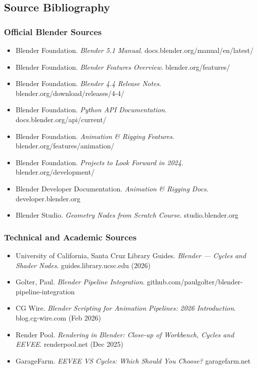 \documentclass[11pt,letterpaper]{article}
\begin{document}
\subsection{Source Bibliography}

\subsubsection{Official Blender Sources}

\begin{itemize}[leftmargin=2em]
  \item Blender Foundation. \textit{Blender 5.1 Manual}. docs.blender.org/manual/en/latest/
  \item Blender Foundation. \textit{Blender Features Overview}. blender.org/features/
  \item Blender Foundation. \textit{Blender 4.4 Release Notes}. blender.org/download/releases/4-4/
  \item Blender Foundation. \textit{Python API Documentation}. docs.blender.org/api/current/
  \item Blender Foundation. \textit{Animation \& Rigging Features}. blender.org/features/animation/
  \item Blender Foundation. \textit{Projects to Look Forward in 2024}. blender.org/development/
  \item Blender Developer Documentation. \textit{Animation \& Rigging Docs}. developer.blender.org
  \item Blender Studio. \textit{Geometry Nodes from Scratch Course}. studio.blender.org
\end{itemize}

\subsubsection{Technical and Academic Sources}

\begin{itemize}[leftmargin=2em]
  \item University of California, Santa Cruz Library Guides. \textit{Blender --- Cycles and Shader Nodes}. guides.library.ucsc.edu (2026)
  \item Golter, Paul. \textit{Blender Pipeline Integration}. github.com/paulgolter/blender-pipeline-integration
  \item CG Wire. \textit{Blender Scripting for Animation Pipelines: 2026 Introduction}. blog.cg-wire.com (Feb 2026)
  \item Render Pool. \textit{Rendering in Blender: Close-up of Workbench, Cycles and EEVEE}. renderpool.net (Dec 2025)
  \item GarageFarm. \textit{EEVEE VS Cycles: Which Should You Choose?} garagefarm.net
\end{itemize}
\end{document}
